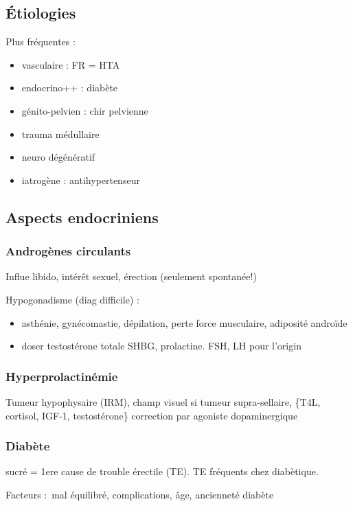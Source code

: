 \documentclass{book}
\begin{document}
\subsection{Étiologies}
\label{sec:orga32f8fa}
Plus fréquentes :
\begin{itemize}
\item vasculaire : FR = HTA
\item endocrino++ : diabète
\item génito-pelvien : chir pelvienne
\item trauma médullaire
\item neuro dégénératif
\item iatrogène : antihypertenseur
\end{itemize}

\subsection{Aspects endocriniens}
\label{sec:org003ca00}
\subsubsection{Androgènes circulants}
\label{sec:orgdf04d4e}
Influe libido, intérêt sexuel, érection (seulement spontanée!)

Hypogonadisme (diag difficile) : 
\begin{itemize}
\item asthénie, gynécomastie, dépilation, perte force musculaire, adiposité androïde
\item doser testostérone totale \textpm{} SHBG, prolactine. FSH, LH pour l'origin
\end{itemize}

\subsubsection{Hyperprolactinémie}
\label{sec:orgec1e479}
Tumeur hypophysaire (IRM), champ visuel si tumeur
supra-sellaire, \{T4L, cortisol, IGF-1, testostérone\}
\thus correction par agoniste dopaminergique

\subsubsection{Diabète}
\label{sec:orgc3c7061}
sucré = 1ere cause de trouble érectile (TE). TE fréquents chez diabètique. 

Facteurs : mal équilibré, complications, âge, ancienneté diabète
\end{document}
